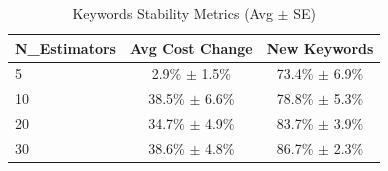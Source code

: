 \begin{table}[htbp]
\centering
\caption{Keywords Stability Metrics (Avg $\pm$ SE)}
\begin{tabular}{lcc}
\toprule
N_Estimators & Avg Cost Change & New Keywords \\
\midrule
5 & 2.9\% $\pm$ 1.5\% & 73.4\% $\pm$ 6.9\% \\
10 & 38.5\% $\pm$ 6.6\% & 78.8\% $\pm$ 5.3\% \\
20 & 34.7\% $\pm$ 4.9\% & 83.7\% $\pm$ 3.9\% \\
30 & 38.6\% $\pm$ 4.8\% & 86.7\% $\pm$ 2.3\% \\
\bottomrule
\end{tabular}
\end{table}